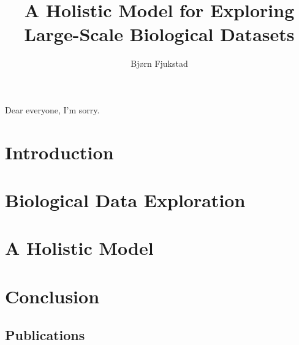 \documentclass[USenglish,phd]{uit-thesis}
\begin{document}
 

\title{A Holistic Model for Exploring Large-Scale Biological Datasets}
\author{Bjørn Fjukstad}
\maketitle

\begin{dedication}
    Dear everyone, I'm sorry.
\end{dedication}

\frontmatter
 
 

\tableofcontents
\mainmatter

\chapter{Introduction}
 

\chapter{Biological Data Exploration}


\chapter{A Holistic Model} 


\chapter{Conclusion}
 

\appendix
\begin{appendix}
    \chapter{Publications}
\end{appendix}
\end{document}

